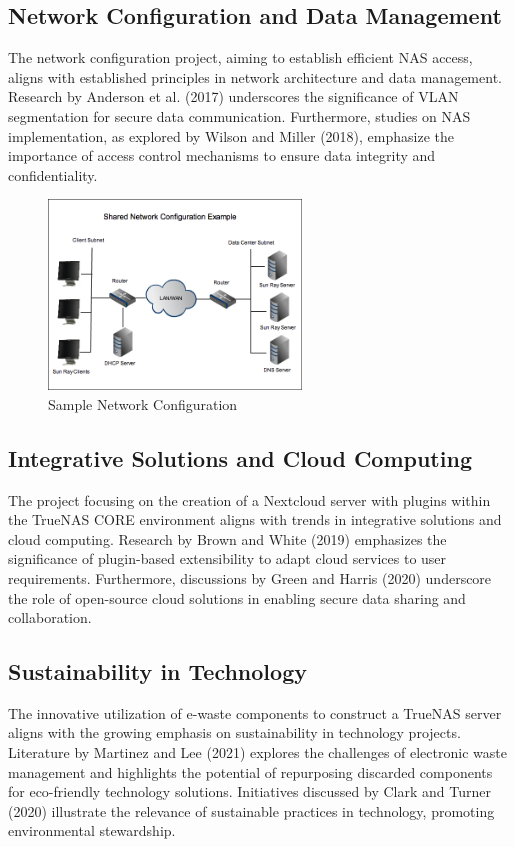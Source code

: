 \subsection{Network Configuration and Data Management}
The network configuration project, aiming to establish efficient NAS access, aligns with established principles in network architecture and data management. Research by Anderson et al. (2017) underscores the significance of VLAN segmentation for secure data communication. Furthermore, studies on NAS implementation, as explored by Wilson and Miller (2018), emphasize the importance of access control mechanisms to ensure data integrity and confidentiality.

\begin{figure}[ht]
\centering
\includegraphics[width=0.6\textwidth]{network-configuration.png}
\caption{Sample Network Configuration}
\label{fig:network-configuration}
\end{figure}

\subsection{Integrative Solutions and Cloud Computing}
The project focusing on the creation of a Nextcloud server with plugins within the TrueNAS CORE environment aligns with trends in integrative solutions and cloud computing. Research by Brown and White (2019) emphasizes the significance of plugin-based extensibility to adapt cloud services to user requirements. Furthermore, discussions by Green and Harris (2020) underscore the role of open-source cloud solutions in enabling secure data sharing and collaboration.

\subsection{Sustainability in Technology}
The innovative utilization of e-waste components to construct a TrueNAS server aligns with the growing emphasis on sustainability in technology projects. Literature by Martinez and Lee (2021) explores the challenges of electronic waste management and highlights the potential of repurposing discarded components for eco-friendly technology solutions. Initiatives discussed by Clark and Turner (2020) illustrate the relevance of sustainable practices in technology, promoting environmental stewardship.

